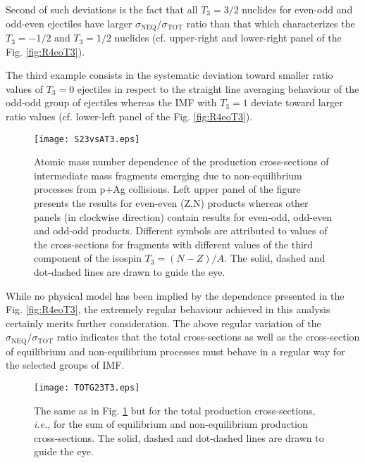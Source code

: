 Second of such
deviations is the fact that all $T_3=3/2$ nuclides for even-odd and
odd-even ejectiles have larger
$\sigma_{\text{NEQ}}/\sigma_{\text{TOT}}$ ratio than that which
characterizes the $T_3=-1/2$ and $T_3=1/2$ nuclides (cf. upper-right
and lower-right panel of the Fig. \ref{fig:R4eoT3}).

The third example consists in the systematic deviation toward
smaller ratio values of $T_3=0$ ejectiles in respect to the straight
line averaging behaviour of the odd-odd group of ejectiles whereas
the IMF with $T_3=1$ deviate toward larger ratio values (cf.
lower-left panel of the Fig. \ref{fig:R4eoT3}).
%
%
\vspace{-0.3cm}
\begin{figure}[!h]
	\centering
	\texttt{[image: S23vsAT3.eps]}
	\caption{Atomic mass number dependence of  the production
		cross-sections of intermediate mass fragments
		emerging due to non-equilibrium processes from p+Ag collisions.   Left upper panel
		of the figure presents the results for even-even (Z,N) products whereas other panels
		(in clockwise direction) contain results for even-odd, odd-even and odd-odd products.
		Different symbols are attributed to values of the cross-sections for fragments with different values of the third
		component of the isospin $T_3=(N-Z)/A$. The solid, dashed and dot-dashed lines are drawn to guide the eye.}
	\label{fig:S23vsAT3}
\end{figure}
While no physical model has been implied by the dependence presented
in the Fig. \ref{fig:R4eoT3}, the extremely regular behaviour
achieved in this  analysis certainly merits further consideration. The above regular variation of the $\sigma_{\text{NEQ}}/\sigma_{\text{TOT}}$ ratio indicates that the total cross-sections as well as the cross-section of equilibrium and non-equilibrium processes must behave in a regular way for the selected groups of IMF.
%
\vspace{-0.3cm}
\begin{figure}[!h]
	\centering
		\texttt{[image: TOTG23T3.eps]}
	\caption{The same as in Fig. \ref{fig:S23vsAT3} but for the total
		production cross-sections, \emph{i.e.}, for the sum of equilibrium and non-equilibrium production cross-sections.
		The solid, dashed and dot-dashed lines are drawn to guide the eye.
	}
	\label{fig:TOTG23T3}
\end{figure}
